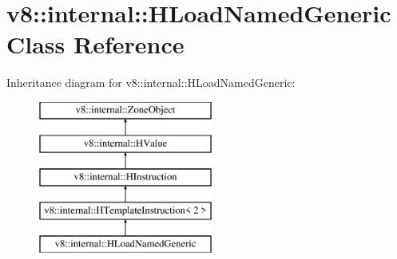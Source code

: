 \hypertarget{classv8_1_1internal_1_1_h_load_named_generic}{}\section{v8\+:\+:internal\+:\+:H\+Load\+Named\+Generic Class Reference}
\label{classv8_1_1internal_1_1_h_load_named_generic}
Inheritance diagram for v8\+:\+:internal\+:\+:H\+Load\+Named\+Generic\+:\begin{figure}[H]
\begin{center}
\leavevmode
\includegraphics[height=5.000000cm]{classv8_1_1internal_1_1_h_load_named_generic}
\end{center}
\end{figure}
